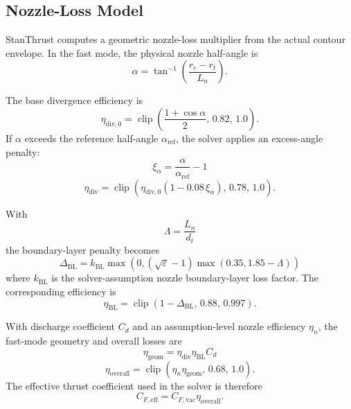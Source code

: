 \documentclass[11pt]{article}
\newcommand{\clip}{\operatorname{clip}}
\begin{document}
\subsection{Nozzle-Loss Model}
StanThrust computes a geometric nozzle-loss multiplier from the actual contour envelope. In the fast mode, the physical nozzle half-angle is
\begin{equation}
\alpha
=
\tan^{-1}\!\left(\frac{r_e-r_t}{L_n}\right).
\label{eq:nozzle-half-angle}
\end{equation}

The base divergence efficiency is
\begin{equation}
\eta_{\text{div},0}=\clip\!\left(\frac{1+\cos\alpha}{2},\,0.82,\,1.0\right).
\label{eq:divergence-eff-base}
\end{equation}
If $\alpha$ exceeds the reference half-angle $\alpha_{\text{ref}}$, the solver applies an excess-angle penalty:
\begin{equation}
\xi_\alpha=\frac{\alpha}{\alpha_{\text{ref}}}-1
\label{eq:excess-angle}
\end{equation}
\begin{equation}
\eta_{\text{div}}
=
\clip\!\left(
\eta_{\text{div},0}(1-0.08\,\xi_\alpha),
\,
0.78,\,
1.0
\right).
\label{eq:divergence-eff}
\end{equation}

With
\begin{equation}
\Lambda=\frac{L_n}{d_t}
\label{eq:length-throat}
\end{equation}
the boundary-layer penalty becomes
\begin{equation}
\Delta_{\text{BL}}
=
k_{\text{BL}}
\max\!\left(0,\left(\sqrt{\varepsilon}-1\right)\max(0.35,1.85-\Lambda)\right)
\label{eq:bl-penalty}
\end{equation}
where $k_{\text{BL}}$ is the solver-assumption nozzle boundary-layer loss factor. The corresponding efficiency is
\begin{equation}
\eta_{\text{BL}}=\clip(1-\Delta_{\text{BL}},\,0.88,\,0.997).
\label{eq:bl-eff}
\end{equation}

With discharge coefficient $C_d$ and an assumption-level nozzle efficiency $\eta_n$, the fast-mode geometry and overall losses are
\begin{equation}
\eta_{\text{geom}}=\eta_{\text{div}}\eta_{\text{BL}}C_d
\label{eq:geom-eff}
\end{equation}
\begin{equation}
\eta_{\text{overall}}=\clip(\eta_n\eta_{\text{geom}},\,0.68,\,1.0).
\label{eq:overall-eff}
\end{equation}
The effective thrust coefficient used in the solver is therefore
\begin{equation}
C_{F,\text{eff}}=C_{F,\text{vac}}\eta_{\text{overall}}.
\label{eq:cf-eff}
\end{equation}
\end{document}

